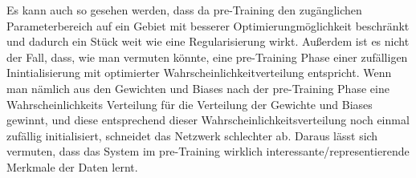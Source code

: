 \documentclass[12pt]{article}
\begin{document}
Es kann auch so gesehen werden, dass da pre-Training den zugänglichen Parameterbereich auf ein Gebiet mit besserer Optimierungmöglichkeit beschränkt und dadurch ein Stück weit wie eine Regularisierung wirkt.\newline\newline
Außerdem ist es nicht der Fall, dass, wie man vermuten könnte, eine pre-Training Phase einer zufälligen Inintialisierung mit optimierter Wahrscheinlichkeitverteilung entspricht. Wenn man nämlich aus den Gewichten und Biases nach der pre-Training Phase eine Wahrscheinlichkeits Verteilung für die Verteilung der Gewichte und Biases gewinnt, und diese entsprechend dieser Wahrscheinlichkeitsverteilung noch einmal zufällig initialisiert, schneidet das Netzwerk schlechter ab. Daraus lässt sich vermuten, dass das System im pre-Training wirklich interessante/representierende Merkmale der Daten lernt.
\end{document}
